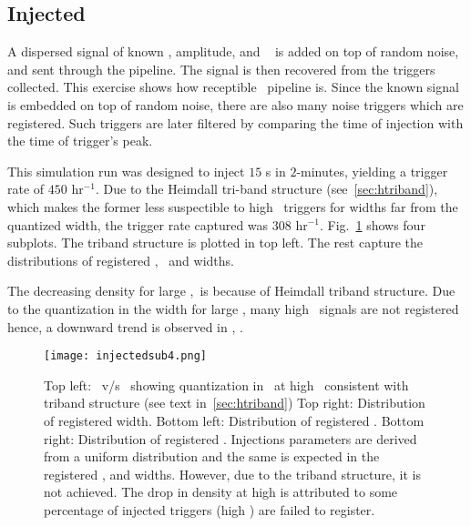 \subsection{Injected}
\label{ssub:injected}
\par A dispersed signal of known \dm, amplitude, and \wd~ is added on top of random noise, and sent through the pipeline.
The signal is then recovered from the triggers collected.
This exercise shows how receptible \vf~pipeline is.
Since the known signal is embedded on top of random noise, there are also many noise triggers which are registered.
Such triggers are later filtered by comparing the time of injection with the time of trigger's peak.
\par This simulation run was designed to inject $15$ \frb{}s in $2$-minutes, yielding a trigger rate of $450$ hr$^{-1}$.
Due to the Heimdall tri-band structure (see~\autoref{sec:htriband}), which makes the former less suspectible to high \dm~triggers for widths far from the quantized width, the trigger rate captured was $308$ hr$^{-1}$.
Fig.~\ref{fig:injected} shows four subplots. The triband structure is plotted in top left. The rest capture the distributions of registered \sn, \dm~and widths.
\par The decreasing density for large \sn,\dm~is because of Heimdall triband structure. 
Due to the quantization in the width for large \dm, many high \dm~signals are not registered hence, a downward trend is observed in \sn, \dm.

\begin{figure}
	\label{fig:injected}
	\texttt{[image: injectedsub4.png]}
	\caption{Top left: \dm~v/s \wd~showing quantization in \wd~at high \dm~consistent with triband structure (see text in~\autoref{sec:htriband})
		Top right: Distribution of registered width.
		Bottom left: Distribution of registered \dm.
		Bottom right: Distribution of registered \sn.
		Injections parameters are derived from a uniform distribution and the same is expected in the registered \sn, \dm and widths.
		However, due to the triband structure, it is not achieved. The drop in density at high \sn is attributed to some percentage of injected triggers (high \dm) are failed to register.
	}
\end{figure}
